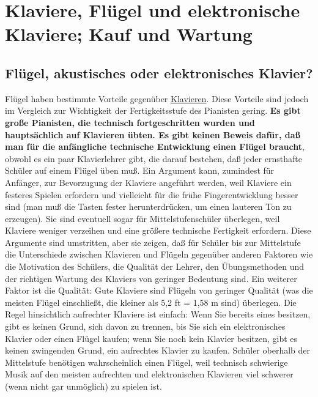 
\section{Klaviere, Flügel und elektronische Klaviere; Kauf und Wartung}\hypertarget{c1iii17}{}
 
\subsection{Flügel, akustisches oder elektronisches Klavier?}\hypertarget{c1iii17a}{}

Flügel haben bestimmte Vorteile gegenüber \hyperlink{upright}{Klavieren}.
Diese Vorteile sind jedoch im Vergleich zur Wichtigkeit der Fertigkeitsstufe des Pianisten gering.
\textbf{Es gibt große Pianisten, die technisch fortgeschritten wurden und hauptsächlich auf Klavieren übten.
Es gibt keinen Beweis dafür, daß man für die anfängliche technische Entwicklung einen Flügel braucht}, obwohl es ein paar Klavierlehrer gibt, die darauf bestehen, daß jeder ernsthafte Schüler auf einem Flügel üben muß.
Ein Argument kann, zumindest für Anfänger, zur Bevorzugung der Klaviere angeführt werden, weil Klaviere ein festeres Spielen erfordern und vielleicht für die frühe Fingerentwicklung besser sind (man muß die Tasten fester herunterdrücken, um einen lauteren Ton zu erzeugen).
Sie sind eventuell sogar für Mittelstufenschüler überlegen, weil Klaviere weniger verzeihen und eine größere technische Fertigkeit erfordern.
Diese Argumente sind umstritten, aber sie zeigen, daß für Schüler bis zur Mittelstufe die Unterschiede zwischen Klavieren und Flügeln gegenüber anderen Faktoren wie die Motivation des Schülers, die Qualität der Lehrer, den Übungsmethoden und der richtigen Wartung des Klaviers von geringer Bedeutung sind.
Ein weiterer Faktor ist die Qualität: Gute Klaviere sind Flügeln von geringer Qualität (was die meisten Flügel einschließt, die kleiner als 5,2 ft = 1,58 m sind) überlegen.
Die Regel hinsichtlich aufrechter Klaviere ist einfach: Wenn Sie bereits eines besitzen, gibt es keinen Grund, sich davon zu trennen, bis Sie sich ein elektronisches Klavier oder einen Flügel kaufen; wenn Sie noch kein Klavier besitzen, gibt es keinen zwingenden Grund, ein aufrechtes Klavier zu kaufen.
Schüler oberhalb der Mittelstufe benötigen wahrscheinlich einen Flügel, weil technisch schwierige Musik auf den meisten aufrechten und elektronischen Klavieren viel schwerer (wenn nicht gar unmöglich) zu spielen ist.

